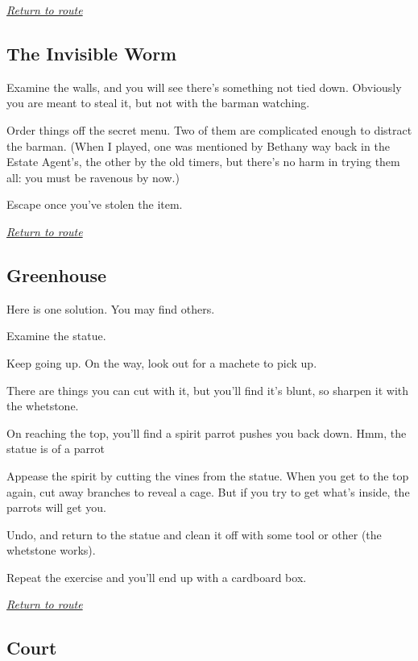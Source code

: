 \documentclass[a5paper]{extarticle}
\begin{document}
\hyperref[sec:route-12]{\emph{Return to route}}

\newpage
\subsection{The Invisible Worm}\label{sec:sol-The-Invisible-Worm}

Examine the walls, and you will see there's something not tied down.
Obviously you are meant to steal it, but not with the barman watching.

Order things off the secret menu.
Two of them are complicated enough to distract the barman.
(When I played, one was mentioned by Bethany way back in the Estate Agent's,
the other by the old timers,
but there's no harm in trying them all: you must be ravenous by now.)

Escape once you've stolen the item.

\hyperref[sec:route-12]{\emph{Return to route}}


\newpage
\subsection{Greenhouse}\label{sec:sol-Greenhouse}

Here is one solution. You may find others.

Examine the statue.

Keep going up. On the way, look out for a machete to pick up.

There are things you can cut with it, but you'll find it's blunt,
so sharpen it with the whetstone.

On reaching the top, you'll find a spirit parrot pushes you back down.
Hmm, the statue is of a parrot\xelip

Appease the spirit by cutting the vines from the statue.
When you get to the top again, cut away branches to reveal a cage.
But if you try to get what's inside, the parrots will get you.

Undo, and return to the statue and clean it off with some tool or other
(the whetstone works).

Repeat the exercise and you'll end up with a cardboard box.

\hyperref[sec:route-13]{\emph{Return to route}}

\newpage
\subsection{Court}\label{sec:sol-Court}
\end{document}
